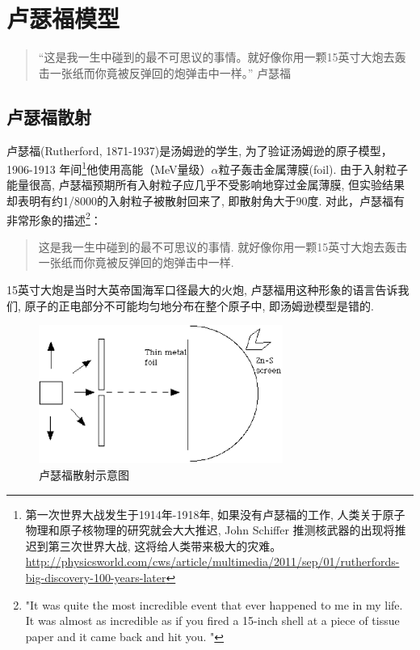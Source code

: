 \section{卢瑟福模型}

\begin{quotation}
“这是我一生中碰到的最不可思议的事情。就好像你用一颗15英寸大炮去轰击一张纸而你竟被反弹回的炮弹击中一样。” \qquad 卢瑟福
\end{quotation}

\subsection{卢瑟福散射}

卢瑟福(Rutherford, 1871-1937)是汤姆逊的学生,
为了验证汤姆逊的原子模型，1906-1913
年间\footnote{第一次世界大战发生于1914年-1918年,
如果没有卢瑟福的工作,
人类关于原子物理和原子核物理的研究就会大大推迟, John Schiffer
推测核武器的出现将推迟到第三次世界大战,
这将给人类带来极大的灾难。\url{http://physicsworld.com/cws/article/multimedia/2011/sep/01/rutherfords-big-discovery-100-years-later}}他使用高能（MeV量级）$\alpha$粒子轰击金属薄膜(foil).
由于入射粒子能量很高,
卢瑟福预期所有入射粒子应几乎不受影响地穿过金属薄膜,
但实验结果却表明有约1/8000的入射粒子被散射回来了, 即散射角大于90度.
对此，卢瑟福有非常形象的描述\footnote{"It was quite the most incredible event that ever happened to me in
my life. It was almost as incredible as if you fired a 15-inch shell
at a piece of tissue paper and it came back and hit you.
"}：


\begin{quote}

这是我一生中碰到的最不可思议的事情.
就好像你用一颗15英寸大炮去轰击一张纸而你竟被反弹回的炮弹击中一样.

\end{quote}

15英寸大炮是当时大英帝国海军口径最大的火炮,
卢瑟福用这种形象的语言告诉我们,
原子的正电部分不可能均匀地分布在整个原子中, 即汤姆逊模型是错的.


\begin{figure}[h]
\begin{center}
\includegraphics[clip,width=8cm]{AtomIdea/1-3.eps}
\caption{卢瑟福散射示意图}
\end{center}
\end{figure}



